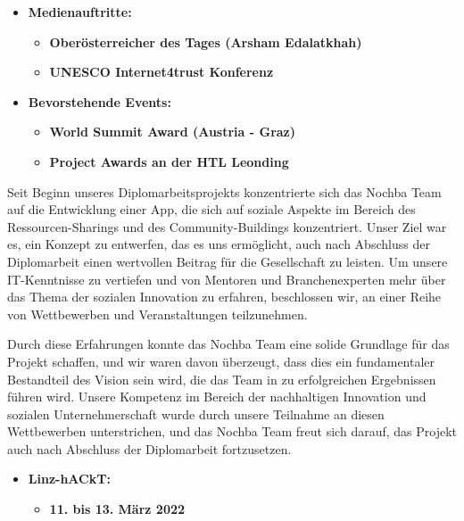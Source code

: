 \begin{itemize}
\begin{itemize}
          \end{itemize}
    \item \textbf{Medienauftritte:}
          \begin{itemize}
              \item \textbf{Oberösterreicher des Tages (Arsham Edalatkhah)}
              \item \textbf{UNESCO Internet4trust Konferenz}
          \end{itemize}
    \item \textbf{Bevorstehende Events:}
          \begin{itemize}
              \item \textbf{World Summit Award (Austria - Graz)}
              \item \textbf{Project Awards an der HTL Leonding}
          \end{itemize}
\end{itemize}

Seit Beginn unseres Diplomarbeitsprojekts konzentrierte sich das Nochba Team auf die Entwicklung einer App, die sich auf soziale Aspekte im Bereich des Ressourcen-Sharings und des Community-Buildings konzentriert. Unser Ziel war es, ein Konzept zu entwerfen, das es uns ermöglicht, auch nach Abschluss der Diplomarbeit einen wertvollen Beitrag für die Gesellschaft zu leisten. Um unsere IT-Kenntnisse zu vertiefen und von Mentoren und Branchenexperten mehr über das Thema der sozialen Innovation zu erfahren, beschlossen wir, an einer Reihe von Wettbewerben und Veranstaltungen teilzunehmen.

Durch diese Erfahrungen konnte das Nochba Team eine solide Grundlage für das Projekt schaffen, und wir waren davon überzeugt, dass dies ein fundamentaler Bestandteil des Vision sein wird, die das Team in zu erfolgreichen Ergebnissen führen wird. Unsere Kompetenz im Bereich der nachhaltigen Innovation und sozialen Unternehmerschaft wurde durch unsere Teilnahme an diesen Wettbewerben unterstrichen, und das Nochba Team freut sich darauf, das Projekt auch nach Abschluss der Diplomarbeit fortzusetzen.

\begin{itemize}
    \item \textbf{Linz-hACkT:}
          \begin{itemize}
              \item \textbf{11. bis 13. März 2022}
          \end{itemize}
\end{itemize}

